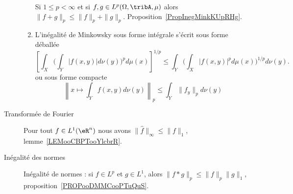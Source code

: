 \begin{description}
\begin{enumerate}
                Si \( 1\leq p<\infty\) et si \( f,g\in L^p(\Omega,\tribA,\mu)\) alors \(  \| f+g \|_p\leq \| f \|_p+\| g \|_p\). Proposition~\ref{PropInegMinkKUpRHg}.
            \item
                L'inégalité de Minkowsky sous forme intégrale s'écrit sous forme déballée
                \begin{equation*}
                    \left[ \int_X\Big( \int_Y| f(x,y) |d\nu(y) \Big)^pd\mu(x) \right]^{1/p}\leq \int_Y\Big( \int_X| f(x,y) |^pd\mu(x) \Big)^{1/p}d\nu(y).
                \end{equation*}
                ou sous forme compacte
                \begin{equation*}
                    \left\|   x\mapsto\int_Y f(x,y)d\nu(y)   \right\|_p\leq \int_Y  \| f_y \|_pd\nu(y)
                \end{equation*}
        \end{enumerate}
    \item[Transformée de Fourier]
                Pour tout \( f\in L^1(\eR^n)\) nous avons \( \| \hat f \|_{\infty}\leq \| f \|_1\), lemme~\ref{LEMooCBPTooYlcbrR}.
    \item[Inégalité des normes]
        Inégalité de normes : si \( f\in L^p\) et \( g\in L^1\), alors \( \| f*g \|_p\leq \| f \|_p\| g \|_1\), proposition~\ref{PROPooDMMCooPTuQuS}.

\end{description}


